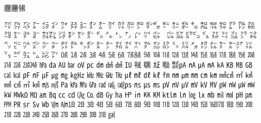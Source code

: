 \documentclass{ctexart}
\begin{document}
𰻝𰻞㋿

㌀	㌁	㌂	㌃	㌄	㌅	㌆	㌇	㌈	㌉	㌊	㌋	㌌	㌍	㌎	㌏㌐	㌑	㌒	㌓	㌔	㌕	㌖	㌗	㌘	㌙	㌚	㌛	㌜	㌝	㌞	㌟㌠	㌡	㌢	㌣	㌤	㌥	㌦	㌧	㌨	㌩	㌪	㌫	\textcolor{red}{\jp ㌬}	㌭	㌮	㌯㌰	㌱	㌲	㌳	㌴	㌵	㌶	㌷	㌸	㌹	㌺	㌻	㌼	㌽	㌾	㌿㍀	㍁	㍂	㍃	㍄	㍅	㍆	㍇	㍈	㍉	㍊	㍋	㍌	㍍	㍎	㍏㍐	㍑	㍒	㍓	㍔	㍕	㍖	㍗	㍘	㍙	㍚	㍛	㍜	㍝	㍞	㍟㍠	㍡	㍢	㍣	㍤	㍥	㍦	㍧	㍨	㍩	㍪	㍫	㍬	㍭	㍮	㍯㍰	㍱	㍲	㍳	㍴	㍵	㍶	㍷	㍸	㍹	㍺	㍻	㍼	㍽	㍾	㍿㎀	㎁	㎂	㎃	㎄	㎅	㎆	㎇	㎈	㎉	㎊	㎋	㎌	㎍	㎎	㎏㎐	㎑	㎒	㎓	㎔	㎕	㎖	㎗	㎘	㎙	㎚	㎛	㎜	㎝	㎞	㎟㎠	㎡	㎢	㎣	㎤	㎥	㎦	㎧	㎨	㎩	㎪	㎫	㎬	㎭	㎮	㎯㎰	㎱	㎲	㎳	㎴	㎵	㎶	㎷	㎸	㎹	㎺	㎻	㎼	㎽	㎾	㎿㏀	㏁	㏂	㏃	㏄	㏅	㏆	㏇	㏈	㏉	㏊	㏋	㏌	㏍	㏎	㏏㏐	㏑	㏒	㏓	㏔	㏕	㏖	㏗	㏘	㏙	㏚	㏛	㏜	㏝	㏞	㏟㏠	㏡	㏢	㏣	㏤	㏥	㏦	㏧	㏨	㏩	㏪	㏫	㏬	㏭	㏮	㏯㏰	㏱	㏲	㏳	㏴	㏵	㏶	㏷	㏸	㏹	㏺	㏻	㏼	㏽	㏾	㏿

㌬
\textcolor{blue}{\yu ㌬}
\textcolor{red}{\jp ㌬}
\end{document}
